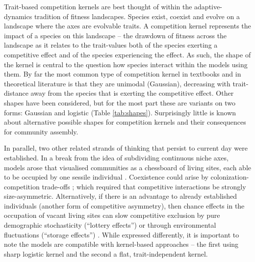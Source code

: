 \documentclass[a4paper,11pt]{article}
\begin{document}
Trait-based competition kernels are best thought of within the
adaptive- dynamics tradition of fitness landscapes. Species exist,
coexist and evolve on a landscape where the axes are evolvable
traits. A competition kernel represents the impact of a species on
this landscape --
the drawdown of fitness across the landscape as it
relates to the trait-values both of the species exerting a competitive
effect and of the species experiencing the effect.
As such, the shape of the kernel is central to the question how
species interact within the models using them.
By far the most common type of competition kernel in textbooks and in
theoretical literature is that they are unimodal (Gaussian),
decreasing with trait-distance away from the species that is exerting
the competitive effect. Other shapes have been considered, but for the
most part these are variants on two forms: Gaussian and logistic
(Table \ref{tab:shapes}).
Surprisingly little is known about alternative possible shapes for
competition kernels and their consequences for community assembly.

In parallel, two other related strands of thinking that persist to current
day were established. In a break from the idea of subdividing continuous
niche axes, models arose
that visualised communities as a chessboard of living sites, each able to be
occupied by one sessile individual \citep{Yodzis-1978}. Coexistence could
arise by colonization-competition trade-offs \citep{Levins-1971,
Geritz-1999, Calcagno-2006}; which required that competitive interactions
be strongly size-asymmetric. Alternatively, if there is an advantage to
already established individuals (another form of competitive asymmetry),
then chance effects in the occupation of vacant living sites can slow
competitive exclusion by pure demographic stochasticity (``lottery
effects'')
\citep {Sale-1977, Hubbell-2001} or through environmental fluctuations
(``storage effects'') \citep{Chesson-1981}.
%
While expressed differently, it is important to note the models are
compatible with kernel-based approaches -- the first using sharp
logistic kernel and the second a flat, trait-independent kernel.
\end{document}
